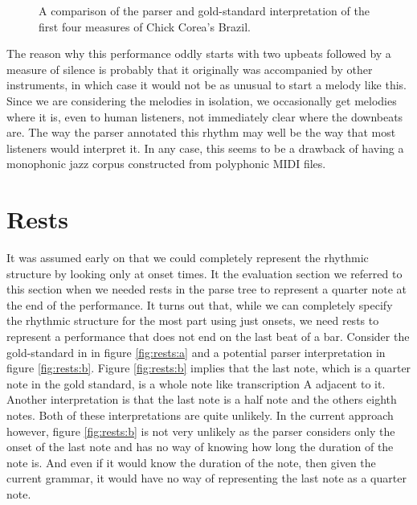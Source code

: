 \begin{figure}
\centering
{}

\caption{A comparison of the parser and gold-standard interpretation of the first four measures of Chick Corea's Brazil.}
\label{fig:brazil}
\end{figure}

The reason why this performance oddly starts with two upbeats followed by a measure of silence is probably that it originally was accompanied by other instruments, in which case it would not be as unusual to start a melody like this. Since we are considering the melodies in isolation, we occasionally get melodies where it is, even to human listeners, not immediately clear where the downbeats are. The way the parser annotated this rhythm may well be the way that most listeners would interpret it. In any case, this seems to be a drawback of having a monophonic jazz corpus constructed from polyphonic MIDI files.

\section{Rests}

It was assumed early on that we could completely represent the rhythmic structure by looking only at onset times. It the evaluation section we referred to this section when we needed rests in the parse tree to represent a quarter note at the end of the performance. It turns out that, while we can completely specify the rhythmic structure for the most part using just onsets, we need rests to represent a performance that does not end on the last beat of a bar. Consider the gold-standard in in figure \ref{fig:rests:a} and a potential parser interpretation in figure \ref{fig:rests:b}. Figure \ref{fig:rests:b} implies that the last note, which is a quarter note in the gold standard, is a whole note like transcription A adjacent to it. Another interpretation is that the last note is a half note and the others eighth notes. Both of these interpretations are quite unlikely. In the current approach however, figure \ref{fig:rests:b} is not very unlikely as the parser considers only the onset of the last note and has no way of knowing how long the duration of the note is. And even if it would know the duration of the note, then given the current grammar, it would have no way of representing the last note as a quarter note. 

